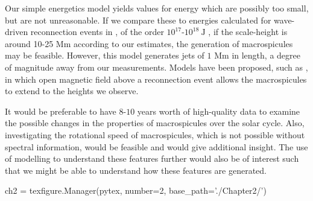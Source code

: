 Our simple energetics model yields values for energy which are possibly too small, but are not unreasonable. If we compare these to energies calculated for wave-driven reconnection events in \cite{Heggland2009}, of the order $10^{17}$-$10^{18}\ \textrm{J}$ , if the scale-height is around 10-25 Mm according to our estimates, the generation of macrospicules may be feasible. However, this model generates jets of $1$ Mm in length, a degree of magnitude away from our measurements. Models have been proposed, such as \cite{Adams2014}, in which open magnetic field above a reconnection event allows the macrospicules to extend to the heights we observe.

It would be preferable to have $8$-$10$ years worth of high-quality data to examine the possible changes in the properties of macrospicules over the solar cycle. Also, investigating the rotational speed of macrospicules, which is not possible without spectral information, would be feasible and would give additional insight. The use of modelling to understand these features further would also be of interest such that we might be able to understand how these features are generated.  



\begin{pycode}[chapter3]
ch2 = texfigure.Manager(pytex, number=2, base_path='./Chapter2/')
\end{pycode}
